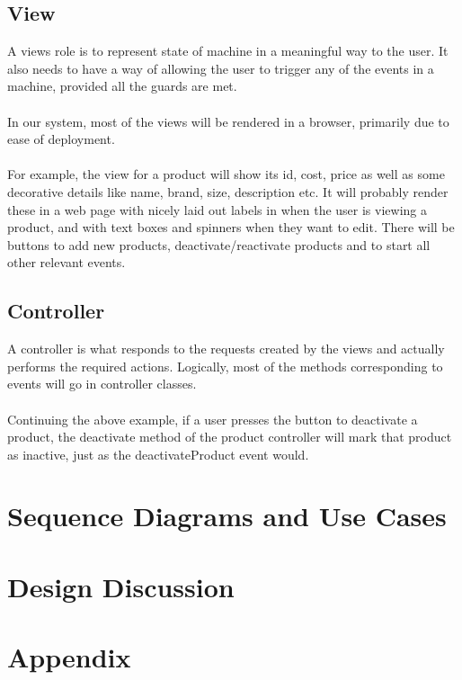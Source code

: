 \documentclass[a4paper]{article}
\begin{document}
\subsection{View}
A views role is to represent state of machine in a meaningful way to the user. It also needs to have a way of allowing the user to trigger any of the events in a machine, provided all the guards are met.
\\\\
In our system, most of the views will be rendered in a browser, primarily due to ease of deployment.
\\\\
For example, the view for a product will show its id, cost, price as well as some decorative details like name, brand, size, description etc. It will probably render these in a web page with nicely laid out labels in when the user is viewing a product, and with text boxes and spinners when they want to edit. There will be buttons to add new products, deactivate/reactivate products and to start all other relevant events.

\subsection{Controller}
A controller is what responds to the requests created by the views and actually performs the required actions. Logically, most of the methods corresponding to events will go in controller classes. 
\\\\
Continuing the above example, if a user presses the button to deactivate a product, the deactivate method of the product controller will mark that product as inactive, just as the deactivateProduct event would.
\pagebreak
\section{Sequence Diagrams and Use Cases}

\pagebreak
\section{Design Discussion}

\pagebreak

\section{Appendix}

\appendix
\end{document}

